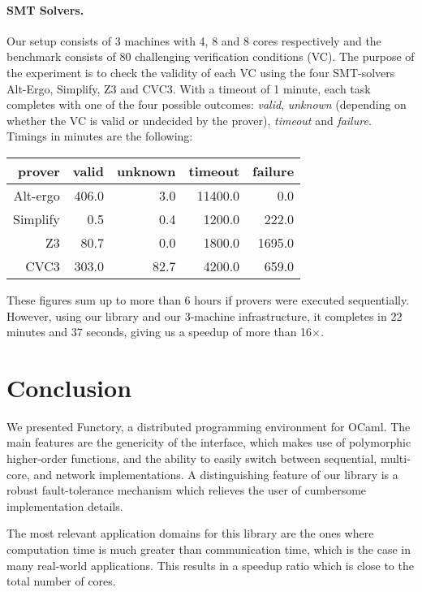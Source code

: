 \documentclass[preprint]{sigplanconf}
\newcommand{\Ocaml}{OCaml}
\newcommand{\functory}{\textsf{Functory}}
\begin{document}
\paragraph{SMT Solvers.}
Our setup consists of 3 machines with 4, 8 and 8 cores
respectively and the benchmark consists of
80 challenging verification conditions (VC).  
The purpose of the experiment is to check the validity of each VC
using the four SMT-solvers Alt-Ergo, Simplify, Z3 and CVC3.
With a timeout of 1 minute, each task completes 
with one of the four possible outcomes: \emph{valid},
\emph{unknown} (depending on
whether the VC is valid or undecided by the prover), 
\emph{timeout} and \emph{failure}.
Timings in minutes are the following:
\begin{center}
  \begin{tabular}{|r||r|r|r|r|}
    \hline
    prover   & valid & unknown & timeout & failure
    \\\hline\hline
    Alt-ergo & 406.0 & 3.0   &  11400.0 & 0.0       
    \\\hline
    Simplify &  0.5   & 0.4   &  1200.0 & 222.0   
    \\\hline
    Z3       & 80.7   & 0.0   &  1800.0 & 1695.0   
    \\\hline
    CVC3     & 303.0  & 82.7  &  4200.0 & 659.0   
    \\\hline
  \end{tabular}
\end{center}
These figures sum up to more than 6 hours if provers were executed
sequentially. However, using our library and our 3-machine
infrastructure, it completes in 22 minutes and 37 seconds, giving us a
speedup of more than 16$\times$. 

\section{Conclusion}

We presented \functory, a distributed programming environment for \Ocaml.
The main features are the genericity of the interface,
which makes use of polymorphic higher-order functions, and the ability
to easily switch between sequential, multi-core, and network
implementations. A distinguishing feature of our library is a
robust fault-tolerance mechanism which relieves
the user of cumbersome implementation details.

The most relevant application domains for this library are the ones
where computation time is much greater than communication time, which
is the case in many real-world applications. This results in a speedup
ratio which is close to the total number of cores.
\end{document}

